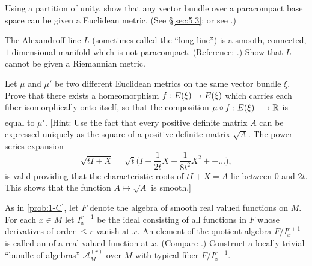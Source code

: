 \documentclass[../main]{subfiles}
\begin{document}
\begin{problem}\label{prob-2-C}
Using a partition of unity, show that any vector bundle over a paracompact base space can be given a Euclidean metric. (See \S\ref{sec:5.3}; or see \cite[pp. 156 and 171]{kelley1955}.)
\end{problem}


\begin{problem}\label{prob-2-D}
The Alexandroff line $L$ (sometimes called the ``long line'') is a smooth, connected, $1$-dimensional manifold which is not paracompact. (Reference: \cite{kneser1958}.) Show that $L$ cannot be given a Riemannian metric.
\end{problem}


\begin{problem}\label{prob-2-E}
Let $\mu$ and $\mu'$ be two different Euclidean metrics on the same vector bundle $\xi$. Prove that there exists a homeomorphism $f : E(\xi)\to E(\xi)$ which carries each fiber isomorphically onto itself, so that the composition  $\mu \circ f : \total(\xi)\varrightarrow{} \bR$ is equal to $\mu'$. [Hint: Use the fact that every positive definite matrix $A$ can be expressed uniquely as the square of a positive definite matrix $\sqrt{A}$. The power
series expansion 
\[
\sqrt{tI+X} = \sqrt{t}\bigg(I + \frac{1}{2t}X - \frac{1}{8t^2}X^2 + - \dots \bigg),
\]
is valid providing that the characteristic roots of $tI+X = A$ lie between $0$ and $2t$. This shows that the function $A \mapsto \sqrt{A}$ is smooth.]
\end{problem}


\begin{problem}\label{prob-2-F}
As in \ref{prob:1-C}, let $F$ denote the algebra of smooth real valued functions on $M$. For each $x\in M$ let $I^{r+1}_x$ be the ideal consisting of all functions in $F$ whose derivatives of order $\leq r$ vanish at $x$. An element of the quotient algebra $F/I^{r+1}_x$ is called an  of a real valued function at $x$. (Compare \cite{ehresmann1953}.) Construct a locally trivial ``bundle of algebras'' $\mathcal{A}_M^{(r)}$ over $M$ with typical fiber $F/I^{r+1}_x$.
\end{problem}
\end{document}
